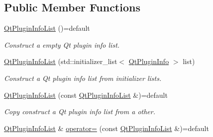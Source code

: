 \subsection*{Public Member Functions}
\begin{DoxyCompactItemize}
\item 
\hyperlink{class_mdt_1_1_deploy_utils_1_1_qt_plugin_info_list_aad91e6890555f214d2dd436407909ba6}{Qt\+Plugin\+Info\+List} ()=default\hypertarget{class_mdt_1_1_deploy_utils_1_1_qt_plugin_info_list_aad91e6890555f214d2dd436407909ba6}{}\label{class_mdt_1_1_deploy_utils_1_1_qt_plugin_info_list_aad91e6890555f214d2dd436407909ba6}

\begin{DoxyCompactList}\small\item\em Construct a empty Qt plugin info list. \end{DoxyCompactList}\item 
\hyperlink{class_mdt_1_1_deploy_utils_1_1_qt_plugin_info_list_aba817092d1709b4d3f6ed00417ed9f2f}{Qt\+Plugin\+Info\+List} (std\+::initializer\+\_\+list$<$ \hyperlink{class_mdt_1_1_deploy_utils_1_1_qt_plugin_info}{Qt\+Plugin\+Info} $>$ list)\hypertarget{class_mdt_1_1_deploy_utils_1_1_qt_plugin_info_list_aba817092d1709b4d3f6ed00417ed9f2f}{}\label{class_mdt_1_1_deploy_utils_1_1_qt_plugin_info_list_aba817092d1709b4d3f6ed00417ed9f2f}

\begin{DoxyCompactList}\small\item\em Construct a Qt plugin info list from initializer lists. \end{DoxyCompactList}\item 
\hyperlink{class_mdt_1_1_deploy_utils_1_1_qt_plugin_info_list_a2c957c9a5b7e54e7435770c84aafa100}{Qt\+Plugin\+Info\+List} (const \hyperlink{class_mdt_1_1_deploy_utils_1_1_qt_plugin_info_list}{Qt\+Plugin\+Info\+List} \&)=default\hypertarget{class_mdt_1_1_deploy_utils_1_1_qt_plugin_info_list_a2c957c9a5b7e54e7435770c84aafa100}{}\label{class_mdt_1_1_deploy_utils_1_1_qt_plugin_info_list_a2c957c9a5b7e54e7435770c84aafa100}

\begin{DoxyCompactList}\small\item\em Copy construct a Qt plugin info list from a other. \end{DoxyCompactList}\item 
\hyperlink{class_mdt_1_1_deploy_utils_1_1_qt_plugin_info_list}{Qt\+Plugin\+Info\+List} \& \hyperlink{class_mdt_1_1_deploy_utils_1_1_qt_plugin_info_list_a78668b294ee896fb6342d829873a598f}{operator=} (const \hyperlink{class_mdt_1_1_deploy_utils_1_1_qt_plugin_info_list}{Qt\+Plugin\+Info\+List} \&)=default\hypertarget{class_mdt_1_1_deploy_utils_1_1_qt_plugin_info_list_a78668b294ee896fb6342d829873a598f}{}\label{class_mdt_1_1_deploy_utils_1_1_qt_plugin_info_list_a78668b294ee896fb6342d829873a598f}


\end{DoxyCompactItemize}
